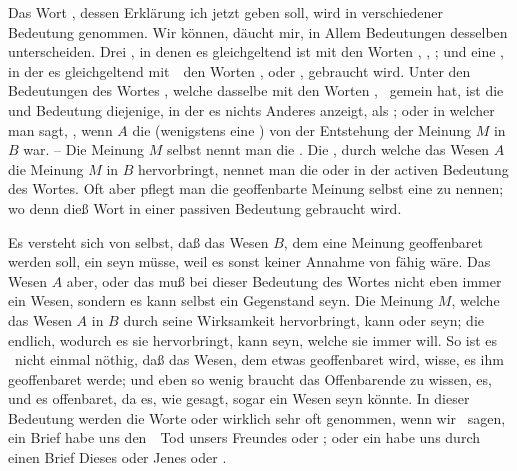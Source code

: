 Das Wort , dessen Erklärung ich jetzt geben soll, wird in verschiedener Bedeutung genommen. Wir können, däucht mir, in Allem  Bedeutungen desselben unterscheiden. Drei , in denen es gleichgeltend ist mit den Worten , ,  \udgl ; und eine , in der es gleichgeltend mit~\ den Worten , oder , gebraucht wird. Unter den  Bedeutungen des Wortes , welche dasselbe mit den Worten ,  \udgl\ gemein hat, ist die  und  Bedeutung diejenige, in der es nichts Anderes anzeigt, als ; oder in welcher man sagt, , wenn $A$ die  (wenigstens eine ) von der Entstehung der Meinung $M$ in $B$ war. -- Die Meinung $M$ selbst nennt man die . Die , durch welche das Wesen $A$ die Meinung $M$ in $B$ hervorbringt, nennet man die  oder  in der activen Bedeutung des Wortes. Oft aber pflegt man die geoffenbarte Meinung selbst eine  zu nennen; wo denn dieß Wort in einer passiven Bedeutung gebraucht wird.\par
Es versteht sich von selbst, daß das Wesen $B$, dem eine Meinung geoffenbaret werden soll, ein  seyn müsse, weil es sonst keiner Annahme von  fähig wäre. Das Wesen $A$ aber, oder das  muß bei dieser Bedeutung des Wortes  nicht eben immer ein  Wesen, sondern es kann selbst ein  Gegenstand seyn. Die Meinung $M$, welche das Wesen $A$ in $B$ durch seine Wirksamkeit hervorbringt, kann  oder  seyn; die  endlich, wodurch es sie hervorbringt, kann seyn, welche sie immer will. So ist es \zB\ nicht einmal nöthig, daß das Wesen, dem etwas geoffenbaret wird, wisse,  es ihm geoffenbaret werde; und eben so wenig braucht das Offenbarende zu wissen,  es, und  es offenbaret, da es, wie gesagt, sogar ein  Wesen seyn könnte. In dieser  Bedeutung werden die Worte  oder  wirklich sehr oft genommen, wenn wir \zB\ sagen, ein Brief habe uns den~\ Tod unsers Freundes  oder ; oder ein  habe uns durch einen Brief Dieses oder Jenes  oder .

